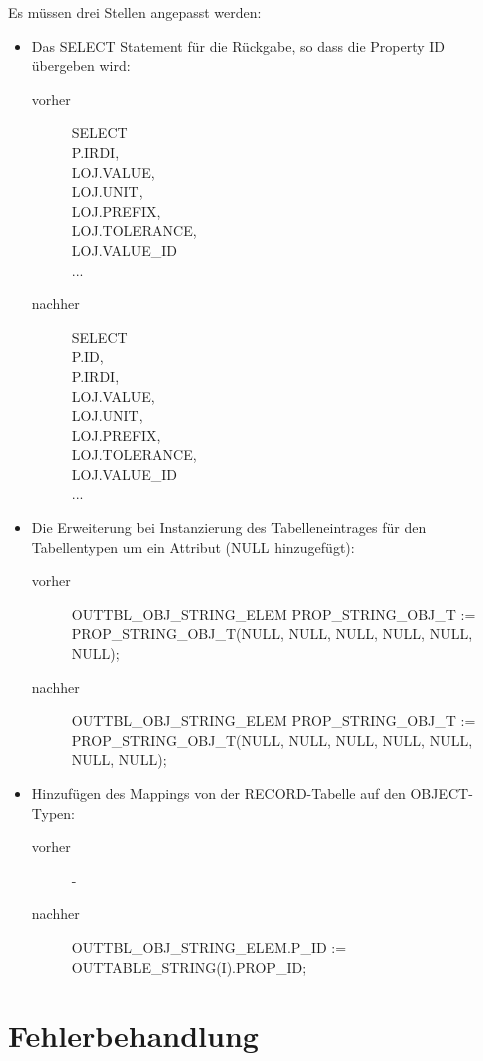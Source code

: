 Es müssen drei Stellen angepasst werden: 

\begin{itemize}
\item Das SELECT Statement für die Rückgabe, so dass die Property ID übergeben wird: 
  \begin{description}
  \item[vorher] SELECT \\
  P.IRDI, \\
  LOJ.VALUE, \\ 
  LOJ.UNIT, \\
  LOJ.PREFIX, \\ 
  LOJ.TOLERANCE, \\
  LOJ.VALUE\_ID \\
  ...
  \item[nachher] SELECT \\
  P.ID, \\
  P.IRDI, \\ 
  LOJ.VALUE, \\ 
  LOJ.UNIT, \\
  LOJ.PREFIX, \\ 
  LOJ.TOLERANCE, \\ 
  LOJ.VALUE\_ID \\
  ...
  \end{description}
\item Die Erweiterung bei Instanzierung des Tabelleneintrages für den Tabellentypen um ein Attribut (NULL hinzugefügt): 
  \begin{description}
  \item[vorher] OUTTBL\_OBJ\_STRING\_ELEM  PROP\_STRING\_OBJ\_T :=  \\
  PROP\_STRING\_OBJ\_T(NULL, NULL, NULL, NULL, NULL, NULL);
  \item[nachher] OUTTBL\_OBJ\_STRING\_ELEM  PROP\_STRING\_OBJ\_T :=  \\
  PROP\_STRING\_OBJ\_T(NULL, NULL, NULL, NULL, NULL, NULL, NULL);
  \end{description}
\item Hinzufügen des Mappings von der RECORD-Tabelle auf den OBJECT-Typen:
  \begin{description}
  \item[vorher] -
  \item[nachher] OUTTBL\_OBJ\_STRING\_ELEM.P\_ID := OUTTABLE\_STRING(I).PROP\_ID;  
  \end{description}
\end{itemize}
 
\section{Fehlerbehandlung}

